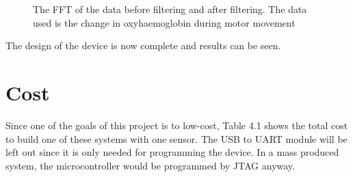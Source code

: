 \begin{figure}[htp]
\centering
{}
\caption[FFT of data]{The FFT of the data before filtering and after filtering. The data used is the change in oxyhaemoglobin during motor movement}
\end{figure}

The design of the device is now complete and results can be seen.

\section{Cost}

Since one of the goals of this project is to low-cost, Table 4.1 shows the total cost to build one of these systems with one sensor. The USB to UART module will be left out since it is only needed for programming the device. In a mass produced system, the microcontroller would be programmed by JTAG anyway.

